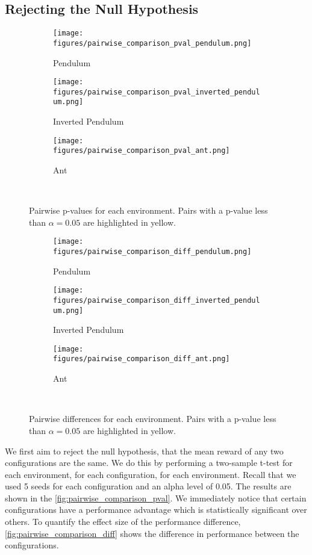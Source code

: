 \documentclass{article}
\begin{document}
\subsection{Rejecting the Null Hypothesis}
\begin{figure}[ht]
    \centering
    \begin{subfigure}{0.3\textwidth}
        \centering
        \texttt{[image: figures/pairwise\_comparison\_pval\_pendulum.png]}
        \caption{Pendulum}
    \end{subfigure}
    \begin{subfigure}{0.3\textwidth}
        \centering
        \texttt{[image: figures/pairwise\_comparison\_pval\_inverted\_pendulum.png]}
        \caption{Inverted Pendulum}
    \end{subfigure}
    \begin{subfigure}{0.3\textwidth}
        \centering
        \texttt{[image: figures/pairwise\_comparison\_pval\_ant.png]}
        \caption{Ant}
    \end{subfigure}
    \captionsetup{justification=centering} \
    \caption{Pairwise p-values for each environment. Pairs with a p-value less than $\alpha = 0.05$ are highlighted in yellow.}
    \label{fig:pairwise_comparison_pval}
\end{figure}
\begin{figure}[ht]
    \centering
    \begin{subfigure}{0.3\textwidth}
        \centering
            \texttt{[image: figures/pairwise\_comparison\_diff\_pendulum.png]}
        \caption{Pendulum}
    \end{subfigure}
    \begin{subfigure}{0.3\textwidth}
        \centering
        \texttt{[image: figures/pairwise\_comparison\_diff\_inverted\_pendulum.png]}
        \caption{Inverted Pendulum}
    \end{subfigure}
    \begin{subfigure}{0.3\textwidth}
        \centering
        \texttt{[image: figures/pairwise\_comparison\_diff\_ant.png]}
        \caption{Ant}
    \end{subfigure}
    \captionsetup{justification=centering} \
    \caption{Pairwise differences for each environment. Pairs with a p-value less than $\alpha = 0.05$ are highlighted in yellow.}
    \label{fig:pairwise_comparison_diff}
\end{figure}


We first aim to reject the null hypothesis, that the mean reward of any two configurations are the same. We do this by performing a two-sample t-test for each environment, for each configuration, for each environment. Recall that we used 5 seeds for each configuration and an alpha level of 0.05. The results are shown in the \autoref{fig:pairwise_comparison_pval}. We immediately notice that certain configurations have a performance advantage which is statistically significant over others. To quantify the effect size of the performance difference, \autoref{fig:pairwise_comparison_diff} shows the difference in performance between the configurations.
\end{document}
